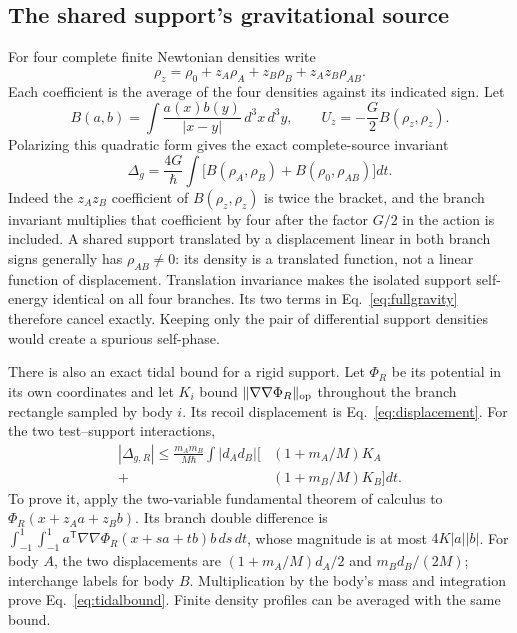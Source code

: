 \subsection{The shared support's gravitational source}
For four complete finite Newtonian densities write
\begin{equation}
\rho_z=\rho_0+z_A\rho_A+z_B\rho_B+z_Az_B\rho_{AB}.
\label{eq:density}
\end{equation}
Each coefficient is the average of the four densities against its indicated sign. Let
\begin{equation}
B(a,b)=\int\frac{a(x)b(y)}{|x-y|}\,d^3x\,d^3y,\qquad
U_z=-\frac G2 B(\rho_z,\rho_z).
\label{eq:bilinear}
\end{equation}
Polarizing this quadratic form gives the exact complete-source invariant
\begin{equation}
\Delta_g=\frac{4G}\hbar\int\bigl[B(\rho_A,\rho_B)+B(\rho_0,\rho_{AB})\bigr]dt.
\label{eq:fullgravity}
\end{equation}
Indeed the $z_Az_B$ coefficient of $B(\rho_z,\rho_z)$ is twice the bracket, and the branch invariant multiplies that coefficient by four after the factor $G/2$ in the action is included. A shared support translated by a displacement linear in both branch signs generally has $\rho_{AB}\ne0$: its density is a translated function, not a linear function of displacement. Translation invariance makes the isolated support self-energy identical on all four branches. Its two terms in Eq.~\eqref{eq:fullgravity} therefore cancel exactly. Keeping only the pair of differential support densities would create a spurious self-phase.

There is also an exact tidal bound for a rigid support. Let $\Phi_R$ be its potential in its own coordinates and let $K_i$ bound $\lVert\nabla\nabla\Phi_R\rVert_{\rm op}$ throughout the branch rectangle sampled by body $i$. Its recoil displacement is Eq.~\eqref{eq:displacement}. For the two test--support interactions,
\begin{equation}
\begin{split}
|\Delta_{g,R}|\le\frac{m_Am_B}{M\hbar}\int |d_Ad_B|\bigl[&(1+m_A/M)K_A\\
+&(1+m_B/M)K_B\bigr]dt.
\end{split}
\label{eq:tidalbound}
\end{equation}
To prove it, apply the two-variable fundamental theorem of calculus to $\Phi_R(x+z_Aa+z_Bb)$. Its branch double difference is $\int_{-1}^1\int_{-1}^1 a^{\mathsf T}\nabla\nabla\Phi_R(x+sa+tb)b\,ds\,dt$, whose magnitude is at most $4K|a||b|$. For body $A$, the two displacements are $(1+m_A/M)d_A/2$ and $m_Bd_B/(2M)$; interchange labels for body $B$. Multiplication by the body's mass and integration prove Eq.~\eqref{eq:tidalbound}. Finite density profiles can be averaged with the same bound.

